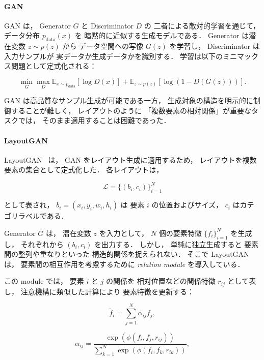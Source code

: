 \documentclass[a4j,12pt,dvipdfmx]{jsreport}
\begin{document}
\paragraph{GAN}
GAN は，
Generator $G$ と Discriminator $D$ の
二者による敵対的学習を通じて，
データ分布 $p_{\text{data}}(x)$ を
暗黙的に近似する生成モデルである．
Generator は潜在変数 $z \sim p(z)$ から
データ空間への写像 $G(z)$ を学習し，
Discriminator は入力サンプルが
実データか生成データかを識別する．
学習は以下のミニマックス問題として定式化される：

\begin{equation}
   \min_G \max_D
   \mathbb{E}_{x \sim p_{\text{data}}}[\log D(x)]
   +
   \mathbb{E}_{z \sim p(z)}[\log (1 - D(G(z)))].
\end{equation}

GAN は高品質なサンプル生成が可能である一方，
生成対象の構造を明示的に制御することが難しく，
レイアウトのように
「複数要素の相対関係」が重要なタスクでは，
そのまま適用することは困難であった．

\paragraph{LayoutGAN}
LayoutGAN~\cite{li_layoutgan_2019} は，
GAN をレイアウト生成に適用するため，
レイアウトを複数要素の集合として定式化した．
各レイアウトは，

\begin{equation}
   \mathcal{L} = \{(b_i, c_i)\}_{i=1}^{N}
\end{equation}

として表され，
$b_i = (x_i, y_i, w_i, h_i)$ は
要素 $i$ の位置およびサイズ，
$c_i$ はカテゴリラベルである．

Generator $G$ は，
潜在変数 $z$ を入力として，
$N$ 個の要素特徴
$\{f_i\}_{i=1}^{N}$ を生成し，
それぞれから $(b_i, c_i)$ を出力する．
しかし，
単純に独立生成すると
要素間の整列や重なりといった
構造的関係を捉えられない．
そこで LayoutGAN は，
要素間の相互作用を考慮するために
\textit{relation module} を導入している．

この module では，
要素 $i$ と $j$ の関係を
相対位置などの関係特徴 $r_{ij}$ として表し，
注意機構に類似した計算により
要素特徴を更新する：

\begin{equation}
   \tilde{f}_i = \sum_{j=1}^{N} \alpha_{ij} f_j,
\end{equation}

\begin{equation}
   \alpha_{ij} =
   \frac{\exp(\phi(f_i, f_j, r_{ij}))}
   {\sum_{k=1}^{N} \exp(\phi(f_i, f_k, r_{ik}))},
\end{equation}
\end{document}
